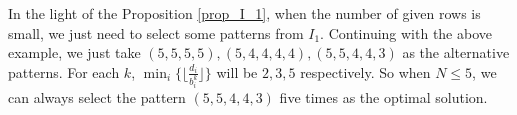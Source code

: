 In the light of the Proposition \ref{prop_I_1}, when the number of given rows is small, we just need to select some patterns from $I_1$.
Continuing with the above example, we just take $(5,5,5,5), (5,4,4,4,4), (5,5,4,4,3)$ as the alternative patterns. For each $k$, $\min_{i} \{\lfloor \frac{d_i}{b_i^k}\rfloor\}$ will be $2,3,5$ respectively. So when $N \leq 5$, we can always select the pattern $(5,5,4,4,3)$ five times as the optimal solution.


\newpage
